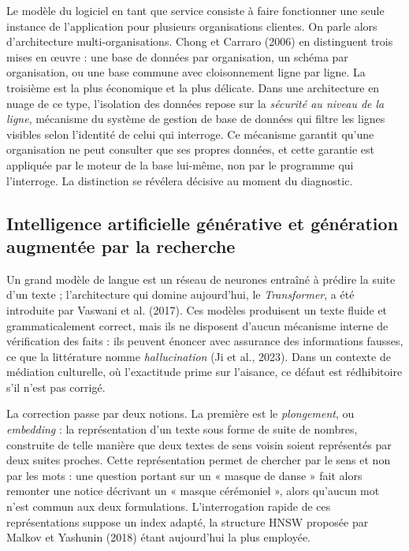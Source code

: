 Le modèle du logiciel en tant que service consiste à faire fonctionner une seule
instance de l'application pour plusieurs organisations clientes. On parle alors
d'architecture multi-organisations. Chong et Carraro (2006) en distinguent trois
mises en œuvre : une base de données par organisation, un schéma par
organisation, ou une base commune avec cloisonnement ligne par ligne. La
troisième est la plus économique et la plus délicate. Dans une architecture en
nuage de ce type, l'isolation des données repose sur la \emph{sécurité au niveau
de la ligne}, mécanisme du système de gestion de base de données qui filtre les
lignes visibles selon l'identité de celui qui interroge. Ce mécanisme garantit
qu'une organisation ne peut consulter que ses propres données, et cette garantie
est appliquée par le moteur de la base lui-même, non par le programme qui
l'interroge. La distinction se révélera décisive au moment du diagnostic.

\subsection{Intelligence artificielle générative et génération augmentée par la recherche}

Un grand modèle de langue est un réseau de neurones entraîné à prédire la suite
d'un texte ; l'architecture qui domine aujourd'hui, le \emph{Transformer}, a été
introduite par Vaswani et al. (2017). Ces modèles produisent un texte fluide et
grammaticalement correct, mais ils ne disposent d'aucun mécanisme interne de
vérification des faits : ils peuvent énoncer avec assurance des informations
fausses, ce que la littérature nomme \emph{hallucination} (Ji et al., 2023).
Dans un contexte de médiation culturelle, où l'exactitude prime sur l'aisance,
ce défaut est rédhibitoire s'il n'est pas corrigé.

La correction passe par deux notions. La première est le \emph{plongement}, ou
\emph{embedding} : la représentation d'un texte sous forme de suite de nombres,
construite de telle manière que deux textes de sens voisin soient représentés
par deux suites proches. Cette représentation permet de chercher par le sens et
non par les mots : une question portant sur un « masque de danse » fait alors
remonter une notice décrivant un « masque cérémoniel », alors qu'aucun mot n'est
commun aux deux formulations. L'interrogation rapide de ces représentations
suppose un index adapté, la structure HNSW proposée par Malkov et Yashunin
(2018) étant aujourd'hui la plus employée.


